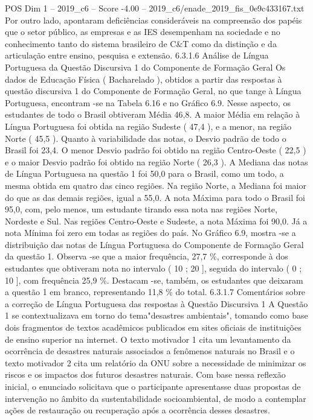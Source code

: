 \begin{textsample}{POS Dim 1 – 2019\_c6 – Score -4.00 – 2019\_c6/enade\_2019\_fis\_0e9c433167.txt}
Por outro lado, apontaram deficiências consideráveis na compreensão dos papéis que o setor público, as empresas e as IES desempenham na sociedade e no conhecimento tanto do sistema brasileiro de C\&T como da distinção e da articulação entre ensino, pesquisa e extensão. 6.3.1.6 Análise de Língua Portuguesa da Questão Discursiva 1 do Componente de Formação Geral Os dados de Educação Física ( Bacharelado ), obtidos a partir das respostas à questão discursiva 1 do Componente de Formação Geral, no que tange à Língua Portuguesa, encontram -se na Tabela 6.16 e no Gráfico 6.9.
Nesse aspecto, os estudantes de todo o Brasil obtiveram Média 46,8.
A maior Média em relação à Língua Portuguesa foi obtida na região Sudeste ( 47,4 ), e a menor, na região Norte ( 45,5 ).
Quanto à variabilidade das notas, o Desvio padrão de todo o Brasil foi 23,4.
O menor Desvio padrão foi obtido na região Centro-Oeste ( 22,5 ) e o maior Desvio padrão foi obtido na região Norte ( 26,3 ).
A Mediana das notas de Língua Portuguesa na questão 1 foi 50,0 para o Brasil, como um todo, a mesma obtida em quatro das cinco regiões.
Na região Norte, a Mediana foi maior do que as das demais regiões, igual a 55,0.
A nota Máxima para todo o Brasil foi 95,0, com, pelo menos, um estudante tirando essa nota nas regiões Norte, Nordeste e Sul.
Nas regiões Centro-Oeste e Sudeste, a nota Máxima foi 90,0.
Já a nota Mínima foi zero em todas as regiões do país.
No Gráfico 6.9, mostra -se a distribuição das notas de Língua Portuguesa do Componente de Formação Geral da questão 1.
Observa -se que a maior frequência, 27,7 \%, corresponde à dos estudantes que obtiveram nota no intervalo ( 10 ; 20 ], seguida do intervalo ( 0 ; 10 ], com frequência 25,9 \%.
Destacam -se, também, os estudantes que deixaram a questão 1 em branco, representando 11,8 \% do total. 6.3.1.7 Comentários sobre a correção de Língua Portuguesa das respostas à Questão Discursiva 1 A Questão 1 se contextualizava em torno do tema"desastres ambientais", tomando como base dois fragmentos de textos acadêmicos publicados em sites oficiais de instituições de ensino superior na internet.
O texto motivador 1 cita um levantamento da ocorrência de desastres naturais associados a fenômenos naturais no Brasil e o texto motivador 2 cita um relatório da ONU sobre a necessidade de minimizar os riscos e os impactos dos futuros desastres naturais.
Com base nessa reflexão inicial, o enunciado solicitava que o participante apresentasse duas propostas de intervenção no âmbito da sustentabilidade socioambiental, de modo a contemplar ações de restauração ou recuperação após a ocorrência desses desastres.

\end{textsample}
